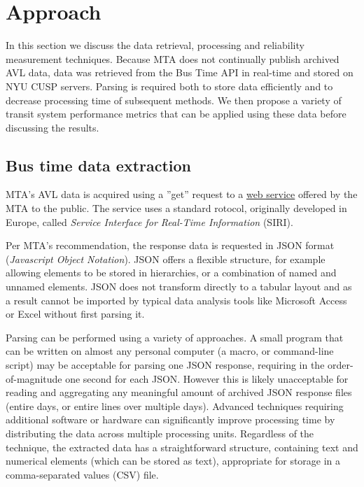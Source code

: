 \documentclass[12pt]{report}
\begin{document}
\newpage

\section{Approach}

In this section we discuss the data retrieval, processing and reliability measurement techniques.  Because MTA does not continually publish archived AVL data, data was retrieved from the Bus Time API in real-time and stored on NYU CUSP servers.  Parsing is required both to store data efficiently and to decrease processing time of subsequent methods.  We then propose a variety of transit system performance metrics that can be applied using these data before discussing the results.


\subsection{Bus time data extraction}

MTA's AVL data is acquired using a ''get'' request to a \href{http://bustime.mta.info/}{web service} offered by the MTA to the public.  The service uses a standard rotocol, originally developed in Europe, called \textit{Service Interface for Real-Time Information} (SIRI). 

Per MTA's recommendation, the response data is requested in JSON format (\textit{Javascript Object Notation}).  JSON offers a flexible structure, for example allowing elements to be stored in hierarchies, or a combination of named and unnamed elements.  JSON does not transform directly to a tabular layout and as a result cannot be imported by typical data analysis tools like Microsoft Access or Excel without first parsing it.

Parsing can be performed using a variety of approaches.  A small program that can be written on almost any personal computer (a macro, or command-line script) may be acceptable for parsing one JSON response, requiring in the order-of-magnitude one second for each JSON.  However this is likely unacceptable for reading and aggregating any meaningful amount of archived JSON response files (entire days, or entire lines over multiple days).  Advanced techniques requiring additional software or hardware can significantly improve processing time by distributing the data across multiple processing units.  Regardless of the technique, the extracted data has a straightforward structure, containing text and numerical elements (which can be stored as text), appropriate for storage in a comma-separated values (CSV) file.
\end{document}
